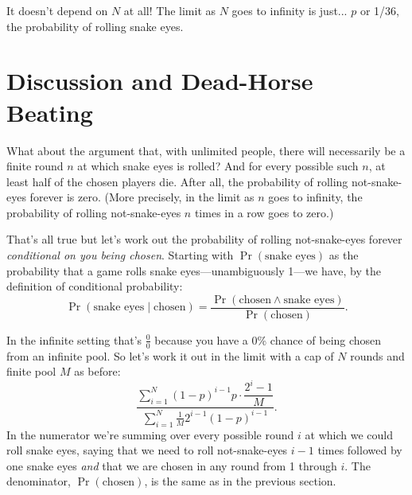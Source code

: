 \documentclass[article,twocolumn]{memoir}
\begin{document}
It doesn't depend on $N$ at all!
The limit as $N$ goes to infinity is just... 
$p$ or 1/36, the probability of rolling snake eyes.
\qedsymbol{}

\chapter*{Discussion and Dead-Horse Beating}

What about the argument that, with unlimited people, there will necessarily be a finite round $n$ at which snake eyes is rolled?
And for every possible such $n$, at least half of the chosen players die.
After all, the probability of rolling not-snake-eyes forever is zero. 
(More precisely, in the limit as $n$ goes to infinity, the probability of rolling not-snake-eyes $n$ times in a row goes to zero.)

That's all true but let's work out the probability of rolling not-snake-eyes forever \emph{conditional on you being chosen}.
Starting with $\Pr(\text{snake eyes})$ as the probability that a game rolls snake eyes---unambiguously 1---we have, by the definition of conditional probability:
\begin{equation*}
\Pr(\text{snake eyes} \mid \text{chosen})
= \frac{\Pr(\text{chosen} \land \text{snake eyes})}{\Pr(\text{chosen})}.
\end{equation*}

In the infinite setting that's
$\tfrac{0}{0}$
because you have a 0\% chance of being chosen from an infinite pool.
So let's work it out in the limit with a cap of $N$ rounds and finite pool $M$ as before:
$$\dfrac
{\sum\limits_{i=1}^{N}(1-p)^{i-1}p \cdot\dfrac{2^i-1}{M}}
{\sum\limits_{i=1}^{N}\tfrac{1}{M} 2^{i-1}(1-p)^{i-1}}.
$$
In the numerator we're summing over every possible round $i$ at which we could roll snake eyes, saying that we need to roll not-snake-eyes $i-1$ times followed by one snake eyes \emph{and} that we are chosen in any round from 1 through $i$.
The denominator, $\Pr(\text{chosen})$, is the same as in the previous section.
\end{document}
